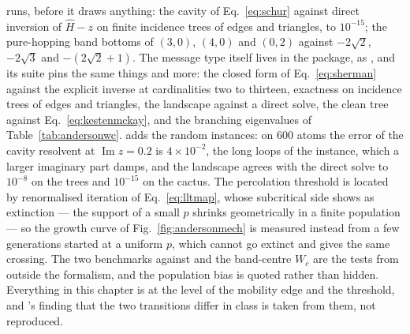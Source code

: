  runs, before it draws
anything: the cavity of Eq.~\eqref{eq:schur} against direct inversion of
$\hat H-z$ on finite incidence trees of edges and triangles, to $10^{-15}$;
the pure-hopping band bottoms of $(3,0)$, $(4,0)$ and $(0,2)$ against
$-2\sqrt2$, $-2\sqrt3$ and $-(2\sqrt2+1)$. The message type itself lives in
the package, as , and its suite
 pins the same things and more: the closed
form of Eq.~\eqref{eq:sherman} against the explicit inverse at cardinalities
two to thirteen, exactness on incidence trees of edges and triangles, the
landscape against a direct solve, the clean tree against
Eq.~\eqref{eq:kestenmckay}, and the branching eigenvalues of
Table~\ref{tab:andersonwc}.  adds the random instances: on $600$ atoms the error of the
cavity resolvent at $\operatorname{Im}z=0.2$ is $4\times10^{-2}$, the
long loops of the instance, which a larger imaginary part damps, and the
landscape agrees with the direct solve to $10^{-8}$ on the trees and
$10^{-15}$ on the cactus. The percolation threshold is located by renormalised
iteration of Eq.~\eqref{eq:lltmap}, whose subcritical side shows as
extinction --- the support of a small $p$ shrinks geometrically in a
finite population --- so the growth curve of Fig.~\ref{fig:andersonmech}
is measured instead from a few generations started at a uniform $p$,
which cannot go extinct and gives the same crossing. The two benchmarks
against \citet{tonetti2026} and the band-centre $W_{c}$ are the tests from
outside the formalism, and the population bias is quoted rather than
hidden. Everything in this chapter is
at the level of the mobility edge and the threshold, and
\citeauthor{tonetti2026}'s finding that the two transitions differ in
class is taken from them, not reproduced.
